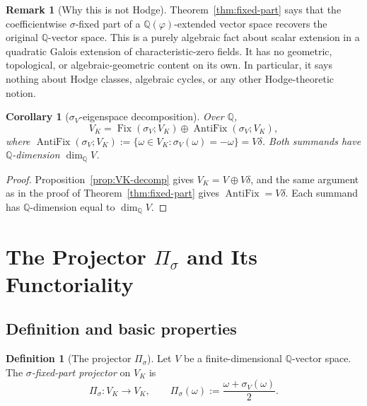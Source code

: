 \documentclass[11pt, a4paper]{amsart}
\newtheorem{corollary}[theorem]{Corollary}
\theoremstyle{definition}
\newtheorem{definition}[theorem]{Definition}
\newtheorem{remark}[theorem]{Remark}
\newcommand{\Q}{\mathbb{Q}}
\newcommand{\Fix}{\operatorname{Fix}}
\begin{document}
\begin{remark}[Why this is not Hodge]
\label{rmk:not-hodge}
Theorem~\ref{thm:fixed-part} says that the coefficientwise
$\sigma$-fixed part of a $\Q(\varphi)$-extended vector space
recovers the original $\Q$-vector space. This is a purely
algebraic fact about scalar extension in a quadratic Galois
extension of characteristic-zero fields. It has no geometric,
topological, or algebraic-geometric content on its own. In
particular, it says nothing about Hodge classes, algebraic cycles,
or any other Hodge-theoretic notion.
\end{remark}

\begin{corollary}[$\sigma_V$-eigenspace decomposition]
\label{cor:eigenspaces}
Over $\Q$,
\[
  V_K = \Fix(\sigma_V; V_K) \oplus \operatorname{AntiFix}(\sigma_V; V_K),
\]
where $\operatorname{AntiFix}(\sigma_V; V_K) := \{\omega \in V_K :
\sigma_V(\omega) = -\omega\} = V\delta$. Both summands have
$\Q$-dimension $\dim_\Q V$.
\end{corollary}

\begin{proof}
Proposition~\ref{prop:VK-decomp} gives $V_K = V \oplus V\delta$,
and the same argument as in the proof of
Theorem~\ref{thm:fixed-part} gives $\operatorname{AntiFix} = V\delta$.
Each summand has $\Q$-dimension equal to $\dim_\Q V$.
\end{proof}

\section{The Projector $\Pi_\sigma$ and Its Functoriality}
\label{sec:pisigma}

\subsection{Definition and basic properties}

\begin{definition}[The projector $\Pi_\sigma$]
\label{def:pisigma}
Let $V$ be a finite-dimensional $\Q$-vector space. The
\emph{$\sigma$-fixed-part projector} on $V_K$ is
\[
  \Pi_\sigma \colon V_K \to V_K,
  \qquad \Pi_\sigma(\omega) := \frac{\omega + \sigma_V(\omega)}{2}.
\]
\end{definition}
\end{document}
